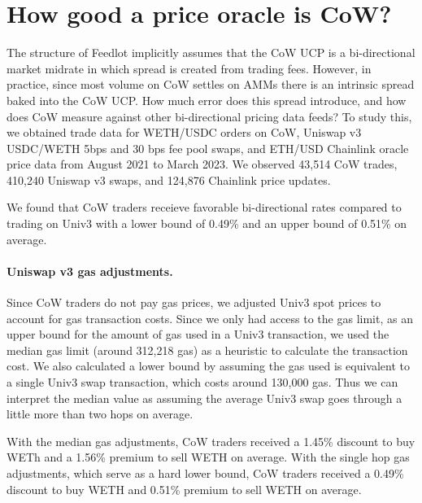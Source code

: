 \documentclass[a4paper,10pt]{article}
\theoremstyle{remark}
\begin{document}
\section{How good a price oracle is CoW?}
\label{price-analysis}

The structure of Feedlot implicitly assumes that the CoW UCP is a bi-directional market midrate in which spread is created from trading fees.
%
However, in practice, since most volume on CoW settles on AMMs there is an intrinsic spread baked into the CoW UCP.
%
How much error does this spread introduce, and how does CoW measure against other bi-directional pricing data feeds?
%
To study this, we obtained trade data for WETH/USDC orders on CoW, Uniswap v3 USDC/WETH 5bps and 30 bps fee pool swaps, and ETH/USD Chainlink oracle price data from August 2021 to March 2023. 
%
We observed 43,514 CoW trades, 410,240 Uniswap v3 swaps, and 124,876 Chainlink price updates. 

We found that CoW traders receieve favorable bi-directional rates compared to trading on Univ3 with a lower bound of 0.49\% and an upper bound of 0.51\% on average. 

\paragraph{Uniswap v3 gas adjustments.}
Since CoW traders do not pay gas prices, we adjusted Univ3 spot prices to account for gas transaction costs.
%
Since we only had access to the gas limit, as an upper bound for the amount of gas used in a Univ3 transaction, we used the median gas limit (around 312,218 gas) as a heuristic to calculate the transaction cost. 
%
We also calculated a lower bound by assuming the gas used is equivalent to a single Univ3 swap transaction, which costs around 130,000 gas. 
%
Thus we can interpret the median value as assuming the average Univ3 swap goes through a little more than two hops on average.

With the median gas adjustments, CoW traders received a 1.45\% discount to buy WETh and a 1.56\% premium to sell WETH on average.
With the single hop gas adjustments, which serve as a hard lower bound, CoW traders received a 0.49\% discount to buy WETH and 0.51\% premium to sell WETH on average.
\end{document}
